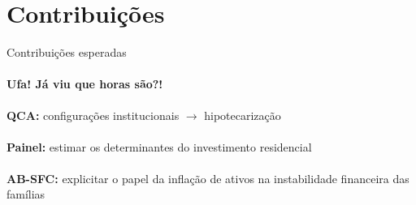 \section{Contribuições}

\begin{frame}{Contribuições esperadas}
\framesubtitle{Ufa! Já viu que horas são?!}

\textbf{QCA:} configurações institucionais $\to$ hipotecarização
\\~\\
\textbf{Painel:} estimar os determinantes do investimento residencial
\\~\\    
\textbf{AB-SFC:} explicitar o papel da inflação de ativos na instabilidade financeira das famílias

\end{frame}